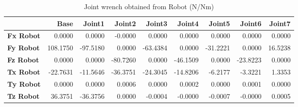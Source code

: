 \begin{table}[h!]
	\centering
	\caption{Joint wrench obtained from Robot (N/Nm)}
	\label{wrech_Robot_Pose15}
	\begin{tabular}{|l|r|r|r|r|r|r|r|r|}
		\hline
		\textbf{} & \textbf{Base} & \textbf{Joint1}  & \textbf{Joint2}  & \textbf{Joint3}  & \textbf{Joint4}  & \textbf{Joint5}  & \textbf{Joint6}  & \textbf{Joint7} \\ \hline
		\textbf{Fx Robot}  & 0.0000        & 0.0000        & -0.0000        & 0.0000        & 0.0000        & 0.0000        & 0.0000        & 0.0000 \\ \hline
		\textbf{Fy Robot}  & 108.1750        & -97.5180        & 0.0000        & -63.4384        & 0.0000        & -31.2221        & 0.0000        & 16.5238 \\ \hline
		\textbf{Fz Robot}  & 0.0000        & 0.0000        & -80.7260        & 0.0000        & -46.1509        & 0.0000        & -23.8223        & 0.0000 \\ \hline
		\textbf{Tx Robot}  & -22.7631        & -11.5646        & -36.3751        & -24.3045        & -14.8206        & -6.2177        & -3.3221        & 1.3353 \\ \hline
		\textbf{Ty Robot}  & 0.0000        & 0.0000        & 0.0006        & 0.0000        & 0.0002        & 0.0000        & 0.0001        & 0.0000 \\ \hline
		\textbf{Tz Robot}  & 36.3751        & -36.3756        & 0.0000        & -0.0004        & -0.0000        & -0.0007        & -0.0000        & 0.0005 \\ \hline
	\end{tabular}
\end{table}

